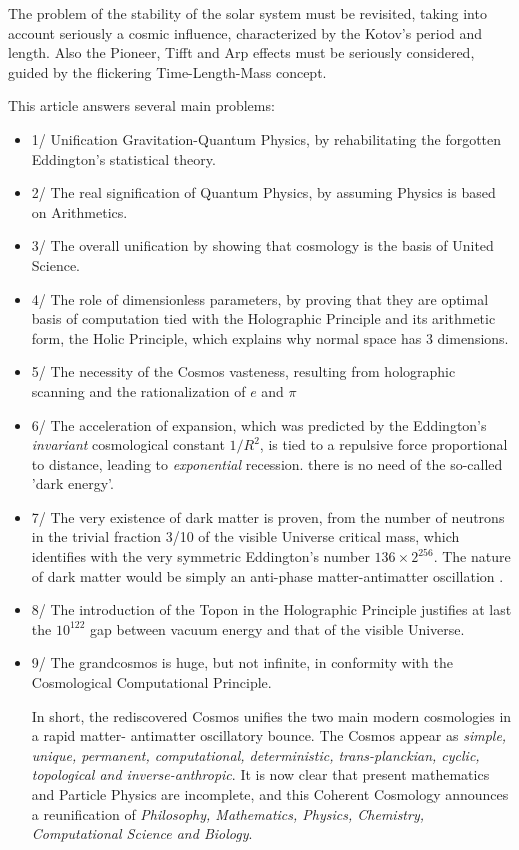 \documentclass[twoside,draft]{article}
\begin{document}
\begin{sloppypar}
The problem of the stability of the solar system must be revisited, taking into account
seriously a cosmic influence, characterized by the Kotov's period and length. Also the Pioneer, Tifft
and Arp effects must be seriously considered, guided by the flickering Time-Length-Mass concept.

This article answers several main problems: 
\begin{itemize}
\item 1/ Unification Gravitation-Quantum Physics, by
rehabilitating the forgotten Eddington's statistical theory. 
\item 2/ The real signification of Quantum
Physics, by assuming Physics is based on Arithmetics. 
\item 3/ The overall unification by showing that
cosmology is the basis of United Science. 
\item 4/ The role of dimensionless parameters, by proving that
they are optimal basis of computation tied with the Holographic Principle and its arithmetic form,
the Holic Principle, which explains why normal space has 3 dimensions.
\item 5/ The necessity of the Cosmos vasteness, resulting from holographic scanning and the rationalization of $e$ and $\pi$
\item 6/ The acceleration of expansion, which was predicted by the Eddington's \textit{invariant} cosmological constant $1/R^2$, is tied to a repulsive force proportional to distance, leading to \textit{exponential} recession. there is no need of the so-called 'dark energy'.
\item 7/ The very existence of dark matter is proven, from the number of neutrons in the trivial fraction 3/10 of the visible Universe critical mass, which identifies with the very symmetric Eddington's number $136 \times 2^{256}$. The nature of dark matter would be simply an anti-phase matter-antimatter oscillation \cite{Sanchez1}.  
\item 8/ The introduction of the Topon in the Holographic Principle justifies at last the $10^{122}$ gap between vacuum energy and that of the visible Universe.
\item 9/ The grandcosmos is huge, but not infinite, in conformity with the Cosmological Computational Principle.

In short, the rediscovered Cosmos unifies the two main modern cosmologies in a rapid matter-
antimatter oscillatory bounce. The Cosmos appear as \textit{simple, unique, permanent, computational,
deterministic, trans-planckian, cyclic, topological and inverse-anthropic}. It is now clear that present mathematics and Particle Physics are incomplete, and this Coherent Cosmology announces a reunification of \textit{Philosophy, Mathematics, Physics, Chemistry, Computational Science and Biology}.




\end{itemize}
\end{sloppypar}
\end{document}
